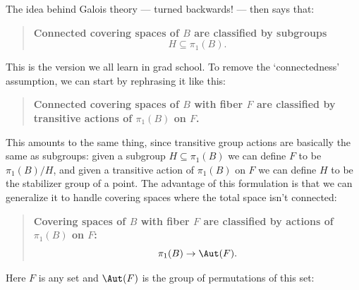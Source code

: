 \documentclass[12pt]{amsart}
\begin{document}
The idea behind Galois theory --- turned backwards! ---
then says that:

\begin{quote}
\textbf{Connected covering spaces of $B$
are classified by subgroups 
\[ H \subseteq \pi_1(B).\] 
}
\end{quote}

\noindent
This is the version we all learn in grad school.
To remove the `connectedness' assumption, we can start by
rephrasing it like this:

\begin{quote}
\textbf{Connected covering spaces of $B$
with fiber $F$ are classified by transitive actions of $\pi_1(B)$ 
on $F$.}
\end{quote}

\noindent
This amounts to the same thing, since 
transitive group actions are basically the same as subgroups:
given a subgroup $H \subseteq \pi_1(B)$ we can define $F$
to be $\pi_1(B)/H$, and given a transitive action of $\pi_1(B)$
on $F$ we can define $H$ to be the stabilizer group of a point.
The advantage of this formulation is that we can generalize it
to handle covering spaces where the total space isn't connected:

\begin{quote}
\textbf{Covering spaces of $B$ with fiber $F$ are classified
by actions of $\pi_1(B)$ on $F$:
\[          \pi_1(B) \to \Aut(F).   \]}
\end{quote}

\noindent
Here $F$ is any set and $\Aut(F)$ is the group of permutations
of this set:
\end{document}
